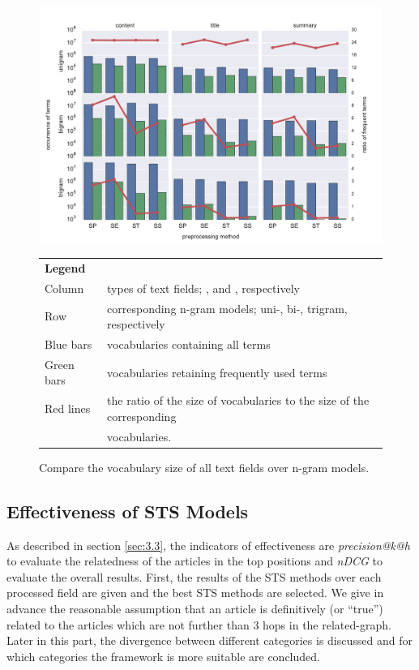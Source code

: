 \begin{figure}[!htb]
    \centering
    \includegraphics[width=\textwidth]{fig/vocab_size}
    \begin{tabular}{|ll|} \hline \textbf{Legend} & \\ Column & types of text fields; \icontent{}, \ititle{} and \isummary{}, respectively \\ Row & corresponding n-gram models; uni-, bi-, trigram, respectively \\ Blue bars & \ifull{} vocabularies containing all terms \\ Green bars & \icommon{} vocabularies retaining frequently used terms \\ Red lines & the ratio of the size of \icommon{} vocabularies to the size of the corresponding \\ & \ifull{} vocabularies. \\ \hline \end{tabular}
    \caption{Compare the vocabulary size of all text fields over n-gram models.}
    \label{fig:vocab_size}
\end{figure}

\subsection{Effectiveness of STS Models}
\label{sec:5.2}


As described in section \ref{sec:3.3}, the indicators of effectiveness are \textit{precision@k@h} to evaluate the relatedness of the articles in the top positions and \textit{nDCG} to evaluate the overall results. First, the results of the STS methods over each processed field are given and the best STS methods are selected. We give in advance the reasonable assumption that an article is definitively (or ``true'') related to the articles which are not further than $3$ hops in the related-graph. Later in this part, the divergence between different categories is discussed and for which categories the framework is more suitable are concluded.  


